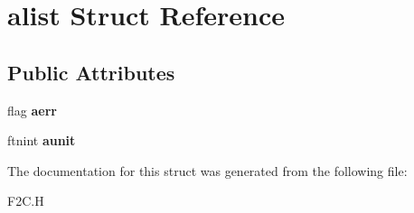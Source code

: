 \hypertarget{structalist}{\section{alist Struct Reference}
\label{structalist}
}
\subsection*{Public Attributes}
\begin{DoxyCompactItemize}
\item 
\hypertarget{structalist_af470841413f5853794fa9830d1e71ecd}{flag {\bfseries aerr}}\label{structalist_af470841413f5853794fa9830d1e71ecd}

\item 
\hypertarget{structalist_a02749fb381f7642c1d5d01902817f673}{ftnint {\bfseries aunit}}\label{structalist_a02749fb381f7642c1d5d01902817f673}

\end{DoxyCompactItemize}


The documentation for this struct was generated from the following file\+:\begin{DoxyCompactItemize}
\item 
F2\+C.\+H\end{DoxyCompactItemize}

